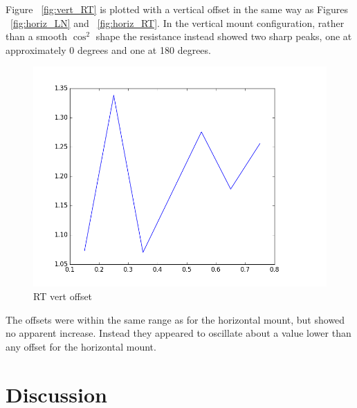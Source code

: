 \documentclass[10pt, twocolumn]{revtex4}
\begin{document}
Figure ~\ref{fig:vert_RT} is plotted with a vertical offset in the same way as Figures ~\ref{fig:horiz_LN} and ~\ref{fig:horiz_RT}. In the vertical mount configuration, rather than a smooth $\cos^2$ shape the resistance instead showed two sharp peaks, one at approximately 0 degrees and one at 180 degrees. 

\begin{figure}[H]
	\centering
	\includegraphics[width = \columnwidth]{Vert_RT_offsets.png}
	\caption{RT vert offset}
	\label{fig:vert_RT_offsets}
\end{figure}

The offsets were within the same range as for the horizontal mount, but showed no apparent increase. Instead they appeared to oscillate about a value lower than any offset for the horizontal mount. %


\section{Discussion}
\end{document}
